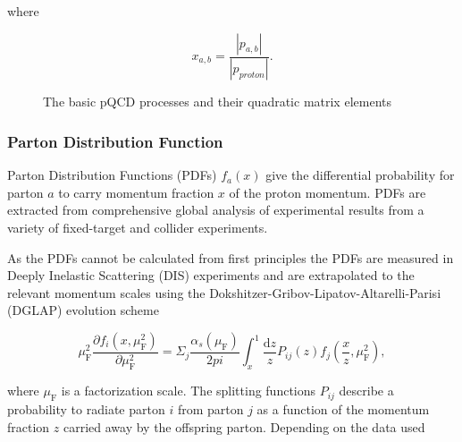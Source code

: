 \noindent where 

\begin{equation}
x_{a,b} = \frac{\left| p_{a,b} \right|}{\left| p_{proton} \right|}.
\end{equation}

%



\begin{figure}[htb]
\centering

\caption[QCD Leading Order]{The basic pQCD processes and their quadratic matrix elements}
\label{fig:qcdlo}
\end{figure}



\subsubsection*{Parton Distribution Function}
Parton Distribution Functions (PDFs) $f_a\left(x\right)$ give the differential probability for parton $a$ to carry momentum fraction $x$ of the proton momentum. PDFs  are extracted from comprehensive global analysis of experimental results from a variety of fixed-target and collider experiments.

As the PDFs cannot be calculated from first principles the PDFs are measured in Deeply Inelastic Scattering (DIS) experiments and are extrapolated to the relevant momentum scales using the Dokshitzer-Gribov-Lipatov-Altarelli-Parisi (DGLAP) evolution scheme ~\cite{Gribov:1972ri,Altarelli:1977zs,Dokshitzer:1977sg}  %

\begin{equation}
\mu_\mathrm{F}^2 \frac{\partial f_i\left(x,\mu_{\mathrm{F}}^2 \right)}{\partial \mu_{\mathrm{F}}^2} = \Sigma_j \frac{\alpha_s\left(\mu_{\mathrm{F}}\right)}{2{pi}} \int _x^1 \frac{\mathrm{d}z}{z} P_{ij}(z) f_j\left(\frac{x}{z},\mu_{\mathrm{F}}^2\right),
\label{eq:dglap}
\end{equation}



\noindent where $\mu_{\mathrm{F}}$ is a factorization scale. The splitting functions $P_{ij}$ describe a probability to radiate parton $i$ from parton $j$ as a function of the momentum fraction $z$ carried away by the offspring parton. Depending on the data used 


